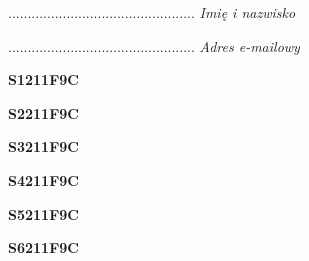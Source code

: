 \begin{turn}{90}\begin{minipage}{\linewidth} \vspace{20mm} ................................................  \textit{Imię i nazwisko}\end{minipage}\end{turn}

\begin{turn}{90}\begin{minipage}{\linewidth} \vspace{20mm} ................................................  \textit{Adres e-mailowy}\end{minipage}\end{turn}

\begin{turn}{90}\huge \begin{minipage}{\linewidth} \vspace{10mm}\textbf{S1211F9C}\end{minipage}\end{turn}

\begin{turn}{90}\huge \begin{minipage}{\linewidth} \vspace{10mm}\textbf{S2211F9C}\end{minipage}\end{turn}

\begin{turn}{90}\huge \begin{minipage}{\linewidth} \vspace{10mm}\textbf{S3211F9C}\end{minipage}\end{turn}

\begin{turn}{90}\huge \begin{minipage}{\linewidth} \vspace{10mm}\textbf{S4211F9C}\end{minipage}\end{turn}

\begin{turn}{90}\huge \begin{minipage}{\linewidth} \vspace{10mm}\textbf{S5211F9C}\end{minipage}\end{turn}

\begin{turn}{90}\huge \begin{minipage}{\linewidth} \vspace{10mm}\textbf{S6211F9C}\end{minipage}\end{turn}

